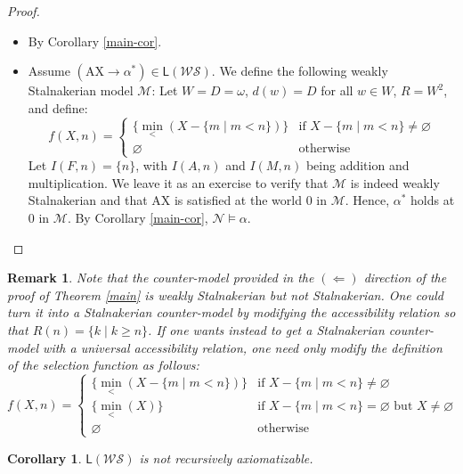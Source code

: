 \documentclass[12pt]{article}
\newtheorem{corollary}{Corollary}
\newtheorem{remark}{Remark}
\newcommand{\then}{\mathbin{\rightarrow}}
\newcommand{\Ax}{\text{AX}}
\begin{document}
\begin{proof}
\begin{itemize}
\item[($\Rightarrow$)] By Corollary \ref{main-cor}.
\item[($\Leftarrow$)] Assume $(\Ax \then \alpha^*) \in \mathsf{L}(\mathcal{WS})$. 
We define the following weakly Stalnakerian model $\mathcal{M}$: 
Let $W = D = \omega$, $d(w)=D$ for all $w\in W$, $R=W^2$, and define:
    \begin{equation*}
        f(X,n) = \begin{cases}
            \{\min_{<}(X - \{m \mid m < n\})\} & \text{if }X - \{m \mid m < n\}\neq\varnothing\\
            \varnothing & \text{otherwise}
        \end{cases}
    \end{equation*}
    Let $I(F,n) = \{n\}$, with $I(A,n)$ and $I(M,n)$ being addition and multiplication. 
    We leave it as an exercise to verify that $\mathcal{M}$ is indeed weakly Stalnakerian and that $\Ax$ is satisfied at the world $0$ in $\mathcal{M}$. 
    Hence, $\alpha^*$ holds at $0$ in $\mathcal{M}$. 
    By Corollary \ref{main-cor}, $\mathcal{N} \vDash \alpha$.
\end{itemize}
\end{proof}

\begin{remark}
Note that the counter-model provided in the $(\Leftarrow)$ direction of the proof of Theorem \ref{main} is \emph{weakly Stalnakerian} but not \emph{Stalnakerian}. One could turn it into a Stalnakerian counter-model by modifying the accessibility relation so that $R(n)=\{k \mid k\geq n\}$. If one wants instead to get a Stalnakerian counter-model with a universal accessibility relation, one need only modify the definition of the selection function as follows:
    \begin{equation*}
        f(X,n) = \begin{cases}
            \{\min_{<}(X - \{m \mid m < n\})\} & \text{if }X - \{m \mid m < n\}\neq\varnothing\\
            \{\min_<(X)\} & \text{if $X - \{m \mid m < n\} = \varnothing$ but $X \neq \varnothing$} \\
            \varnothing & \text{otherwise}
        \end{cases}
    \end{equation*}
\end{remark}


\begin{corollary}\label{cor:wsnonax}
    $\mathsf{L}(\mathcal{WS})$ is not recursively axiomatizable. 
\end{corollary}
\end{document}
